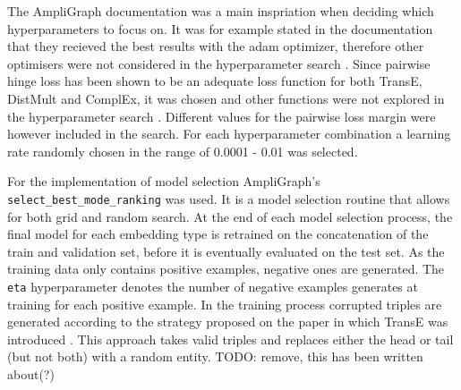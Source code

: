 The AmpliGraph documentation was a main inspriation when deciding which hyperparameters to focus on. It was for example stated in the documentation that they recieved the best results with the adam optimizer, therefore other optimisers were not considered in the hyperparameter search \cite{ampligraph_documentation}. Since pairwise hinge loss has been shown to be an adequate loss function for both TransE, DistMult and ComplEx, it was chosen and other functions were not explored in the hyperparameter search \cite{mohamed2019loss}. Different values for the  pairwise loss margin were however included in the search. For each hyperparameter combination a learning rate randomly chosen in the range of 0.0001 - 0.01 was selected. 

For the implementation of model selection AmpliGraph's \texttt{select\_best\_mode\_ranking} was used. It is a model selection routine that allows for both grid and random search. At the end of each model selection process, the final model for each embedding type is retrained on the concatenation of the train and validation set, before it is eventually evaluated on the test set. As the training data only contains positive examples, negative ones are generated. The \texttt{eta} hyperparameter denotes the number of negative examples generates at training for each positive example. In the training process corrupted triples are generated according to the strategy proposed on the paper in which TransE was introduced \cite{TransE}. This approach takes valid triples and replaces either the head or tail (but not both) with a random entity. TODO: remove, this has been written about(?)

